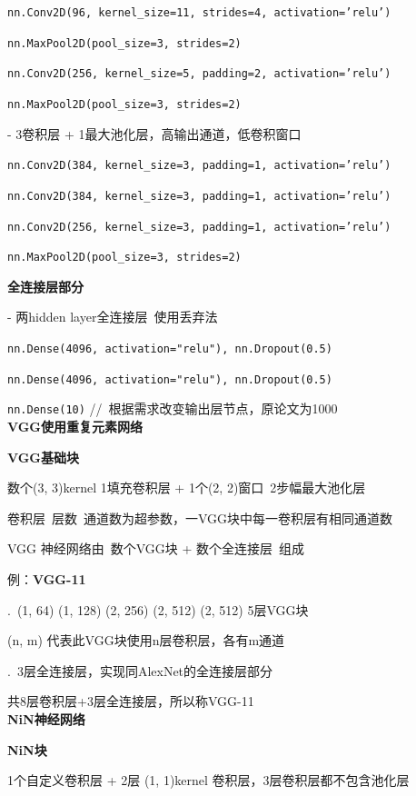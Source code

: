 \documentclass[UTF8]{ctexart}
\begin{document}
  \quad \texttt{nn.Conv2D(96, kernel\_size=11, strides=4, activation='relu')}

  \quad \texttt{nn.MaxPool2D(pool\_size=3, strides=2)}

  \quad \texttt{nn.Conv2D(256, kernel\_size=5, padding=2, activation='relu')}

  \quad \texttt{nn.MaxPool2D(pool\_size=3, strides=2)}
  
  \quad - 3卷积层 + 1最大池化层，高输出通道，低卷积窗口
  
  \quad \texttt{nn.Conv2D(384, kernel\_size=3, padding=1, activation='relu')}
  
  \quad \texttt{nn.Conv2D(384, kernel\_size=3, padding=1, activation='relu')} 
  
  \quad \texttt{nn.Conv2D(256, kernel\_size=3, padding=1, activation='relu')}
  
  \quad \texttt{nn.MaxPool2D(pool\_size=3, strides=2)}

  \textbf{全连接层部分}
  
  \quad - 两hidden layer全连接层\ 使用丢弃法

  \quad \texttt{nn.Dense(4096, activation="relu"), nn.Dropout(0.5)}
  
  \quad \texttt{nn.Dense(4096, activation="relu"), nn.Dropout(0.5)}
  
  \quad \texttt{nn.Dense(10)} //\ 根据需求改变输出层节点，原论文为1000\\
\textbf{VGG使用重复元素网络}

  \textbf{VGG基础块}

  \quad 数个(3, 3)kernel 1填充卷积层 + 1个(2, 2)窗口\ 2步幅最大池化层

  \quad 卷积层\ 层数\ 通道数为超参数，一VGG块中每一卷积层有相同通道数

  VGG 神经网络由\ 数个VGG块 + 数个全连接层\ 组成

  例：\textbf{VGG-11}
  
  .\ (1, 64) (1, 128) (2, 256) (2, 512) (2, 512) 5层VGG块

  \quad \quad (n, m) 代表此VGG块使用n层卷积层，各有m通道
  
  .\ 3层全连接层，实现同AlexNet的全连接层部分
  
  \quad 共8层卷积层+3层全连接层，所以称VGG-11\\
\textbf{NiN神经网络}

  \textbf{NiN块}

  \quad 1个自定义卷积层 + 2层 (1, 1)kernel 卷积层，3层卷积层都不包含池化层
\end{document}
